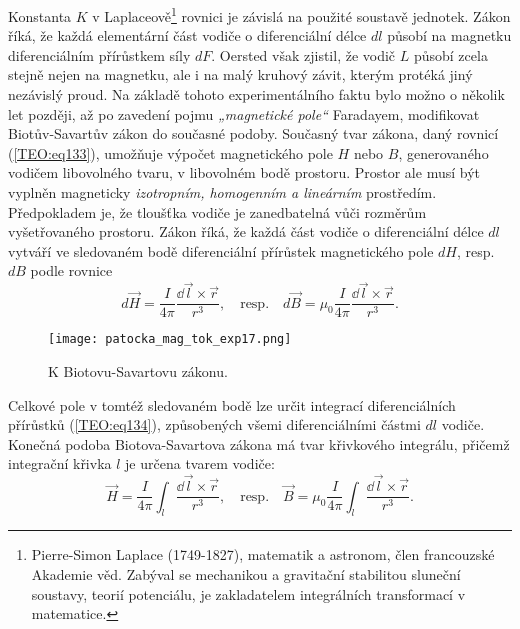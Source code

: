     Konstanta \(K\) v Laplaceově\footnote{Pierre-Simon Laplace (1749-1827), matematik a astronom,
    člen francouzské Akademie věd. Zabýval se mechanikou a gravitační stabilitou sluneční soustavy,
    teorií potenciálu, je zakladatelem integrálních transformací v matematice.} rovnici je závislá
    na použité soustavě jednotek. Zákon říká, že každá elementární část vodiče o diferenciální délce
    \(dl\) působí na magnetku diferenciálním přírůstkem síly \(dF\). Oersted však zjistil, že vodič
    \(L\) působí zcela stejně nejen na magnetku, ale i na malý kruhový závit, kterým protéká jiný
    nezávislý proud. Na základě tohoto experimentálního faktu bylo možno o několik let později, až
    po zavedení pojmu \emph{„magnetické pole“} Faradayem, modifikovat Biotův-Savartův zákon do
    současné podoby. Současný tvar zákona, daný rovnicí (\ref{TEO:eq133}), umožňuje výpočet
    magnetického pole \(H\) nebo \(B\), generovaného vodičem libovolného tvaru, v libovolném bodě
    prostoru. Prostor ale musí být vyplněn magneticky \emph{izotropním, homogenním a lineárním}
    prostředím. Předpokladem je, že tloušťka vodiče je zanedbatelná vůči rozměrům vyšetřovaného
    prostoru. Zákon říká, že každá část vodiče o diferenciální délce \(dl\) vytváří ve sledovaném
    bodě diferenciální přírůstek magnetického pole \(dH\), resp. \(dB\) podle rovnice
    \begin{equation}\label{TEO:eq134}
      d\vec{H} = \frac{I}{4\pi}\frac{\dd{\vec{l}}\times \vec{r}}{r^3}, \quad\text{resp.}\quad
      d\vec{B} = \mu_0\frac{I}{4\pi}\frac{\dd{\vec{l}}\times \vec{r}}{r^3}.
    \end{equation}     
    \begin{figure}[ht!]
      \centering
      \texttt{[image: patocka\_mag\_tok\_exp17.png]}
      \caption{K Biotovu-Savartovu zákonu.}
      \label{es:fig_patocka_mag_tok_exp17}
    \end{figure}
    Celkové pole v tomtéž sledovaném bodě lze určit integrací diferenciálních přírůstků 
    (\ref{TEO:eq134}), způsobených všemi diferenciálními částmi \(dl\) vodiče. Konečná 
    podoba Biotova-Savartova zákona má tvar křivkového integrálu, přičemž integrační křivka \(l\) 
    je určena tvarem vodiče:
    \begin{equation}\label{TEO:eq135}
      \vec{H} = \frac{I}{4\pi}\int_l\frac{\dd{\vec{l}}\times \vec{r}}{r^3}, \quad\text{resp.}\quad
      \vec{B} = \mu_0\frac{I}{4\pi}\int_l\frac{\dd{\vec{l}}\times \vec{r}}{r^3}.
    \end{equation} 
    
